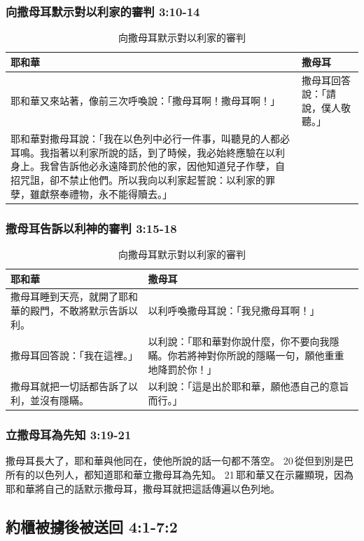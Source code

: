 \subsubsection{向撒母耳默示對以利家的審判 3:10-14}
\begin{table}[H]
\centering
\begin{tabular}{p{11.5cm}|p{5.5cm}}\hline
耶和華&撒母耳\\\hline
耶和華又來站著，像前三次呼喚說：「撒母耳啊！撒母耳啊！」&撒母耳回答說：「請說，僕人敬聽。」\\\hline
耶和華對撒母耳說：「我在以色列中必行一件事，叫聽見的人都必耳鳴。我指著以利家所說的話，到了時候，我必始終應驗在以利身上。我曾告訴他必永遠降罰於他的家，因他知道兒子作孽，自招咒詛，卻不禁止他們。所以我向以利家起誓說：以利家的罪孽，雖獻祭奉禮物，永不能得贖去。」&\\\hline
\end{tabular}
\caption{向撒母耳默示對以利家的審判}
\end{table}  

\subsubsection{撒母耳告訴以利神的審判 3:15-18}
\begin{table}[H]
\centering
\begin{tabular}{p{8.5cm}|p{8.5cm}}\hline
耶和華&撒母耳\\\hline
撒母耳睡到天亮，就開了耶和華的殿門，不敢將默示告訴以利。&以利呼喚撒母耳說：「我兒撒母耳啊！」\\\hline
撒母耳回答說：「我在這裡。」 &以利說：「耶和華對你說什麼，你不要向我隱瞞。你若將神對你所說的隱瞞一句，願他重重地降罰於你！」\\\hline
撒母耳就把一切話都告訴了以利，並沒有隱瞞。&以利說：「這是出於耶和華，願他憑自己的意旨而行。」\\\hline
\end{tabular}
\caption{向撒母耳默示對以利家的審判}
\end{table}  


\subsubsection{立撒母耳為先知 3:19-21}
撒母耳長大了，耶和華與他同在，使他所說的話一句都不落空。 20 從但到別是巴所有的以色列人，都知道耶和華立撒母耳為先知。 21 耶和華又在示羅顯現，因為耶和華將自己的話默示撒母耳，撒母耳就把這話傳遍以色列地。

\subsection{約櫃被擄後被送回 4:1-7:2}

